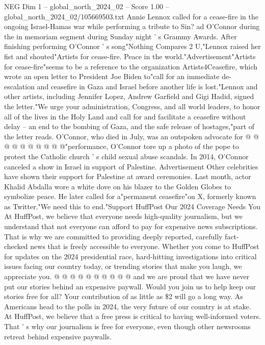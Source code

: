 \begin{textsample}{NEG Dim 1 – global\_north\_2024\_02 – Score 1.00 – global\_north\_2024\_02/105669503.txt}  \label{ex:f1_neg_354}
Annie Lennox called for a cease-fire in the ongoing Israel-Hamas war while performing a tribute to Sin? ad O'Connor during the in memoriam segment during Sunday night ' s Grammy Awards.
After finishing performing O'Connor ' s song"Nothing Compares 2 U,"Lennox raised her fist and shouted"Artists for cease-fire.
Peace in the world."Advertisement"Artists for cease-fire"seems to be a reference to the organization Artists4Ceasefire, which wrote an open letter to President Joe Biden to"call for an immediate de-escalation and ceasefire in Gaza and Israel before another life is lost."Lennox and other artists, including Jennifer Lopez, Andrew Garfield and Gigi Hadid, signed the letter."We urge your administration, Congress, and all world leaders, to honor all of the lives in the Holy Land and call for and facilitate a ceasefire without delay -- an end to the bombing of Gaza, and the safe release of hostages,"part of the letter reads.
O'Connor, who died in July, was an outspoken advocate for @ @ @ @ @ @ @ @ @ @"performance, O'Connor tore up a photo of the pope to protest the Catholic church ' s child sexual abuse scandals.
In 2014, O'Connor canceled a show in Israel in support of Palestine.
Advertisement Other celebrities have shown their support for Palestine at award ceremonies.
Last month, actor Khalid Abdalla wore a white dove on his blazer to the Golden Globes to symbolize peace.
He later called for a"permanent ceasefire"on X, formerly known as Twitter."We need this to end."Support HuffPost Our 2024 Coverage Needs You At HuffPost, we believe that everyone needs high-quality journalism, but we understand that not everyone can afford to pay for expensive news subscriptions.
That is why we are committed to providing deeply reported, carefully fact-checked news that is freely accessible to everyone.
Whether you come to HuffPost for updates on the 2024 presidential race, hard-hitting investigations into critical issues facing our country today, or trending stories that make you laugh, we appreciate you. @ @ @ @ @ @ @ @ @ @ and we are proud that we have never put our stories behind an expensive paywall.
Would you join us to help keep our stories free for all?
Your contribution of as little as \$2 will go a long way.
As Americans head to the polls in 2024, the very future of our country is at stake.
At HuffPost, we believe that a free press is critical to having well-informed voters.
That ' s why our journalism is free for everyone, even though other newsrooms retreat behind expensive paywalls.

\end{textsample}

